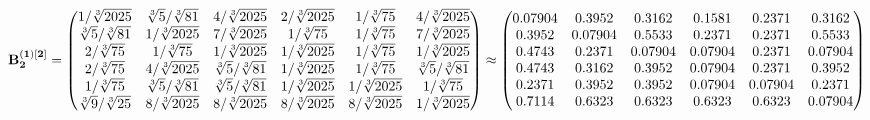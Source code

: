 \documentclass[10pt,a4paper]{article}
\begin{document}
	\[
		\bold{B_2^{(1)[2]}} = 
		\begin{pmatrix}
			{1} / {\sqrt[3]{2025}} & {\sqrt[3]{5}} / {\sqrt[3]{81}} & {{4}} / {\sqrt[3]{2025}} & {{2}} / {\sqrt[3]{2025}} & {1} / {\sqrt[3]{75}} & {{4}} / {\sqrt[3]{2025}} \\
			{\sqrt[3]{5}} / {\sqrt[3]{81}} & {1} / {\sqrt[3]{2025}} & {{7}} / {\sqrt[3]{2025}} & {1} / {\sqrt[3]{75}} & {1} / {\sqrt[3]{75}} & {{7}} / {\sqrt[3]{2025}} \\
			{{2}} / {\sqrt[3]{75}} & {1} / {\sqrt[3]{75}} & {1} / {\sqrt[3]{2025}} & {1} / {\sqrt[3]{2025}} & {1} / {\sqrt[3]{75}} & {1} / {\sqrt[3]{2025}} \\
			{{2}} / {\sqrt[3]{75}} & {{4}} / {\sqrt[3]{2025}} & {\sqrt[3]{5}} / {\sqrt[3]{81}} & {1} / {\sqrt[3]{2025}} & {1} / {\sqrt[3]{75}} & {\sqrt[3]{5}} / {\sqrt[3]{81}} \\
			{1} / {\sqrt[3]{75}} & {\sqrt[3]{5}} / {\sqrt[3]{81}} & {\sqrt[3]{5}} / {\sqrt[3]{81}} & {1} / {\sqrt[3]{2025}} & {1} / {\sqrt[3]{2025}} & {1} / {\sqrt[3]{75}} \\
			{\sqrt[3]{9}} / {\sqrt[3]{25}} & {{8}} / {\sqrt[3]{2025}} & {{8}} / {\sqrt[3]{2025}} & {{8}} / {\sqrt[3]{2025}} & {{8}} / {\sqrt[3]{2025}} & {1} / {\sqrt[3]{2025}} \\
		\end{pmatrix}
		\approx
		\begin{pmatrix}
			0.07904  & 0.3952   & 0.3162   & 0.1581   & 0.2371   & 0.3162   \\
			0.3952   & 0.07904  & 0.5533   & 0.2371   & 0.2371   & 0.5533   \\
			0.4743   & 0.2371   & 0.07904  & 0.07904  & 0.2371   & 0.07904  \\
			0.4743   & 0.3162   & 0.3952   & 0.07904  & 0.2371   & 0.3952   \\
			0.2371   & 0.3952   & 0.3952   & 0.07904  & 0.07904  & 0.2371   \\
			0.7114   & 0.6323   & 0.6323   & 0.6323   & 0.6323   & 0.07904  \\
		\end{pmatrix}
	\]
\end{document}
